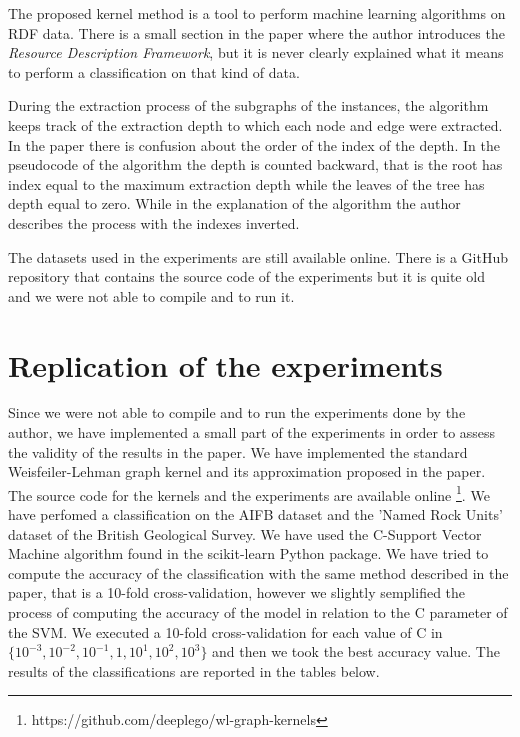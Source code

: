 \documentclass[12pt]{scrartcl}
\begin{document}
The proposed kernel method is a tool to perform machine learning algorithms on RDF data. There is a small section in the paper where the author introduces the \textit{Resource Description Framework}, but it is never clearly explained what it means to perform a classification on that kind of data.

During the extraction process of the subgraphs of the instances, the algorithm keeps track of the extraction depth to which each node and edge were extracted. In the paper there is confusion about the order of the index of the depth. In the pseudocode of the algorithm the depth is counted backward, that is the root has index equal to the maximum extraction depth while the leaves of the tree has depth equal to zero. While in the explanation of the algorithm the author describes the process with the indexes inverted.

The datasets used in the experiments are still available online. There is a GitHub repository that contains the source code of the experiments but it is quite old and we were not able to compile and to run it.


\section{Replication of the experiments}

Since we were not able to compile and to run the experiments done by the author, we have implemented a small part of the experiments in order to assess the validity of the results in the paper. We have implemented the standard Weisfeiler-Lehman graph kernel and its approximation proposed in the paper. The source code for the kernels and the experiments are available online \footnote{https://github.com/deeplego/wl-graph-kernels}. We have perfomed a classification on the AIFB dataset \cite{swrc} and the 'Named Rock Units' dataset of the  British Geological Survey. We have used the C-Support Vector Machine algorithm found in the scikit-learn Python package. We have tried to compute the accuracy of the classification with the same method described in the paper, that is a 10-fold cross-validation, however we slightly semplified the process of computing the accuracy of the model in relation to the C parameter of the SVM. We executed a 10-fold cross-validation for each value of C in $\{10^{-3}, 10^{-2}, 10^{-1}, 1, 10^1, 10^2, 10^3\}$ and then we took the best accuracy value. The results of the classifications are reported in the tables below.

\newpage
\end{document}
